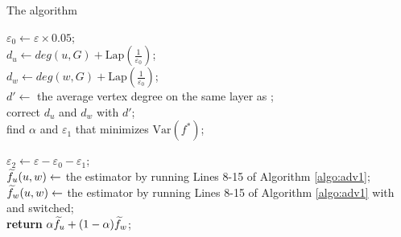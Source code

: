 \begin{algorithm}[tbh]
    \small
	\caption{The \advds algorithm}
	\label{algo:adv2}
	\LinesNumbered
        $\varepsilon_0 \gets \varepsilon \times 0.05$;\\
        $ d_u \gets deg(u, G) + \text{Lap}(\frac{1}{\varepsilon_0})$;\\
        $ d_w \gets deg(w, G) + \text{Lap}(\frac{1}{\varepsilon_0})$; \\
        $d' \gets$ the average vertex degree on the same layer as \vq;\\
        correct $d_u$ and $d_w$ with $d'$;\\
        find $\alpha$ and $\varepsilon_1$ that minimizes $\text{Var}(f^*)$;\\
        
            $\varepsilon_2 \gets \varepsilon - \varepsilon_0 -\varepsilon_1$;\\
            $\widetilde{f}_u(u, w) \gets $ the estimator by running Lines 8-15 of Algorithm \ref{algo:adv1};\\
            $\widetilde{f}_w(u, w) \gets $ the estimator by running Lines 8-15 of Algorithm \ref{algo:adv1} with \vq and \vx switched;\\                     
	\textbf{return} $\alpha \widetilde{f}_u + (1 - \alpha) \widetilde{f}_w$;\\
\end{algorithm}


